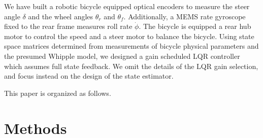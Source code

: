\documentclass[letterpaper,11pt]{article}
\begin{document}
We have built a robotic bicycle equipped optical encoders to measure the steer
angle $\delta$ and the wheel angles $\theta_r$ and $\theta_f$.  Additionally, a
MEMS rate gyroscope fixed to the rear frame measures roll rate $\dot{\phi}$.
The bicycle is equipped a rear hub motor to control the speed and a steer motor
to balance the bicycle. Using state space matrices determined from measurements
of bicycle physical parameters and the presumed Whipple model, we designed a
gain scheduled LQR controller which assumes full state feedback. We omit the
details of the LQR gain selection, and focus instead on the design of the state
estimator.

This paper is organized as follows. 

\section{Methods} \label{sec:methods}
\end{document}
